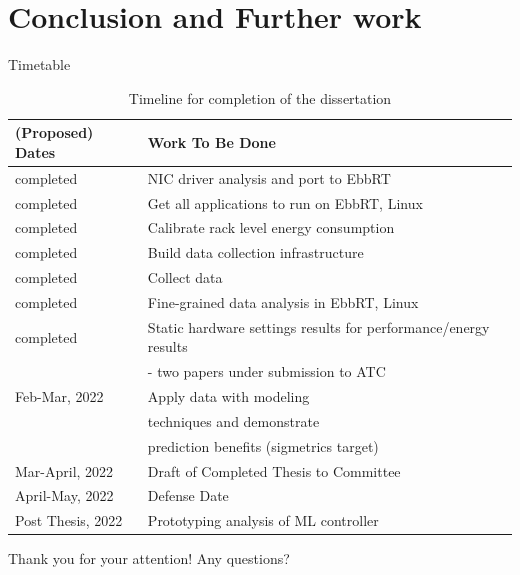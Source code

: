 \documentclass[notes=only,10pt,xcolor=table]{beamer}
\begin{document}


\section{Conclusion and Further work}

\begin{frame}{Timetable}
\begin{table}[t]
\small
\begin{tabular}{l l}
(Proposed) Dates & Work To Be Done\\ \hline
completed & NIC driver analysis and port to EbbRT \\
completed & Get all applications to run on EbbRT, Linux \\
completed & Calibrate rack level energy consumption \\
completed & Build data collection infrastructure \\
completed & Collect data \\
completed & Fine-grained data analysis in EbbRT, Linux \\ 
completed & Static hardware settings results for performance/energy results \\ & - two papers under submission to ATC \\
Feb-Mar, 2022 & Apply data with modeling \\ & techniques and demonstrate \\ & prediction benefits (sigmetrics target) \\
Mar-April, 2022 & Draft of Completed Thesis to Committee \\
April-May, 2022 & Defense Date \\
Post Thesis, 2022 & Prototyping analysis of ML controller
\end{tabular}
\caption{Timeline for completion of the dissertation}
\label{table:timeline_thesis}
\end{table}
\end{frame}



\begin{frame}{\Large Thank you for your attention!}
  \centering \Large Any questions?
\end{frame}

\printbibliography

 
\end{document}
